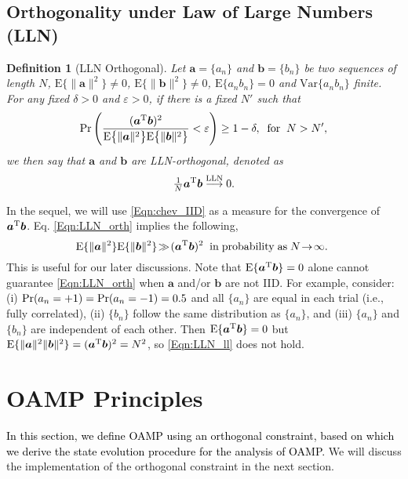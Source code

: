 \documentclass[journal]{IEEEtran}
\newcommand{\mr}{\mathrm}
\newcommand{\BE}{\begin{equation}}
\newcommand{\EE}{\end{equation}}
\renewcommand{\bf}{\bm}
\newtheorem{definition}[theorem]{Definition}
\newcommand{\LL}[1]{\textcolor{black}{#1}}
\begin{document}
\subsection{Orthogonality under Law of Large Numbers (LLN)}

\begin{definition}[LLN Orthogonal]
 Let $\bf{a}=\{a_n\}$ and $\bf{b}=\{b_n\}$ be two sequences of length $N$, $\mr{E}\{\|\bf{a}\|^2\}\neq 0$,  $\mr{E}\{\|\bf{b}\|^2\}\neq 0$, $ \mr{E}\{a_n b_n\}=0$ and  $ \mr{Var}\{ a_n b_n\}$ finite. For any fixed $\delta>0$ and $\varepsilon>0$, if there is a fixed $N'$ such that
\BE\label{Eqn:chev_IID}
\mr{Pr}\left( \frac{(\bf{a}^{\rm T}\bf{b})^2}{\mr{E}\big\{\|\bf{a}\|^2\big\}\mr{E}\big\{\|\bf{b}\|^2\big\}}<\varepsilon\right) \ge 1-\delta, \;\; \mr{for} \;\; N>N',
\EE
we then say that  $\bf{a}$ and $\bf{b}$  are LLN-orthogonal, denoted as
\BE\label{Eqn:LLN_orth}
 \tfrac{1}{N}\bf{a}^{\rm T}\bf{b} \overset{\rm LLN}{\longrightarrow}0.
\EE
\end{definition}

In the sequel, we will use \eqref{Eqn:chev_IID} as a measure for the convergence of $\bf{a}^{\rm T}\bf{b}$. Eq. \eqref{Eqn:LLN_orth}  implies the following, 
\BE\label{Eqn:LLN_ll}
\!\!\mr{E}\{\|\bf{a}\|^2\}\mr{E}\{\|\bf{b}\|^2\} \!\gg\! (\bf{a}^{\rm T}\bf{b})^2 \;\; {\rm in\; probability\; as}\; N\!\to\!\infty.  
\EE
This is useful for our later discussions. Note that  $\mr{E}\{\bf{a}^{\rm T}\bf{b}\}=0 $ alone cannot guarantee \eqref{Eqn:LLN_orth} when $\bf{a}$ and/or $\bf{b}$ are not IID. For example, consider: (i) ${\rm Pr}(a_n = +1) = {\rm Pr}(a_n = -1) = 0.5$ and all $\{a_n\}$ are equal in each trial (i.e., fully correlated), (ii) $\{b_n\}$ follow the same distribution as $\{a_n\}$, and (iii) $\{a_n\}$ and $\{b_n\}$ are independent of each other. Then $\mr{E}\{\bf{a}^{\rm T}\bf{b}\}=0 $  but $\mr{E}\{\|\bf{a}\|^2\|\bf{b}\|^2\}= (\bf{a}^{\rm T}\bf{b})^2=N^2$, so \eqref{Eqn:LLN_ll} does not hold.






 



 


\section{ OAMP Principles}\label{Sec:OAMP_Principle}
\LL{In this section, we define OAMP using an orthogonal constraint, based on which we derive the state evolution procedure for the analysis of OAMP.} We will discuss the implementation of the orthogonal constraint in the next section.
\end{document}
